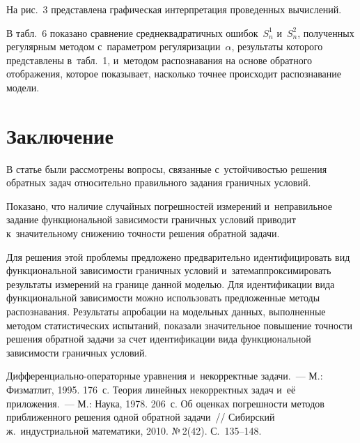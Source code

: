 \begin{multicols}{2}
  
  На рис.~3 представлена графическая интерпретация проведенных 
вычислений.


  
  В табл.~6 показано сравнение среднеквадратичных ошибок~$S_n^1$ 
и~$S_n^2$, полученных регулярным методом с~параметром 
регуляризации~$\alpha$, результаты которого представлены в~табл.~1, 
и~методом распознавания на основе обратного отображения, которое 
показывает, насколько точнее происходит распознавание модели.
  
    \vspace*{-9pt}

\section{Заключение}

  В статье были рассмотрены вопросы, связанные с~устойчивостью решения 
обратных задач относительно правильного задания граничных условий. 

Показано, что наличие случайных погрешностей измерений и~неправильное 
задание функциональной зависимости граничных условий приводит 
к~значительному снижению точности решения обратной задачи. 

Для решения 
этой проблемы предложено предварительно идентифицировать вид 
функциональной зависимости граничных условий и~затем\linebreak аппроксимировать 
результаты измерений на границе данной моделью. Для идентификации вида 
функциональной зависимости можно использовать предложенные методы 
распознавания. Результаты апробации на модельных данных, выполненные 
методом статистических испытаний, показали значительное повышение 
точности решения обратной задачи за счет идентификации вида 
функциональной зависимости граничных условий.
  
  
  \vspace*{-6pt}
  
{\small\frenchspacing
 {%
 \begin{thebibliography}{99}
Диф\-фе\-рен\-ци\-аль\-но-опе\-ра\-тор\-ные уравнения и~некорректные 
задачи.~--- М.: Физматлит, 1995. 176~с.
     Теория линейных 
некорректных задач и~её приложения.~--- М.: Наука, 1978. 206~с.
     Об оценках погрешности методов 
приближенного решения одной обратной задачи~// Сибирский 
ж.~индустриальной математики, 2010. №\,2(42). С.~135--148.
   

\end{thebibliography}}}
\end{multicols}
